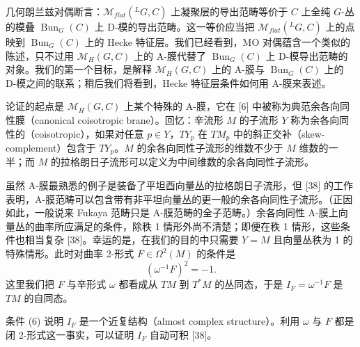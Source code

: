 \documentclass[11pt,a4paper,UTF8]{ctexart}
\begin{document}
几何朗兰兹对偶断言：$\mathcal{M}_{flat}({}^{L}G,C)$ 上凝聚层的导出范畴等价于 $C$ 上全纯 $G$-丛的模叠 $\operatorname{Bun}_{G}(C)$ 上 D-模的导出范畴。这一等价应当把 $\mathcal{M}_{flat}({}^{L}G,C)$ 上的点映到 $\operatorname{Bun}_{G}(C)$ 上的 Hecke 特征层。我们已经看到，MO 对偶蕴含一个类似的陈述，只不过用 $\mathcal{M}_{H}(G,C)$ 上的 A-膜代替了 $\operatorname{Bun}_{G}(C)$ 上 D-模导出范畴的对象。我们的第一个目标，是解释 $\mathcal{M}_{H}(G,C)$ 上的 A-膜与 $\operatorname{Bun}_{G}(C)$ 上的 D-模之间的联系；稍后我们将看到，Hecke 特征层条件如何用 A-膜来表述。

论证的起点是 $\mathcal{M}_{H}(G,C)$ 上某个特殊的 A-膜，它在 [6] 中被称为典范余各向同性膜（canonical coisotropic brane）。回忆：辛流形 $M$ 的子流形 $Y$ 称为余各向同性的（coisotropic），如果对任意 $p\in Y$，$TY_{p}$ 在 $TM_{p}$ 中的斜正交补（skew-complement）包含于 $TY_{p}$。$M$ 的余各向同性子流形的维数不少于 $M$ 维数的一半；而 $M$ 的拉格朗日子流形可以定义为中间维数的余各向同性子流形。


虽然 A-膜最熟悉的例子是装备了平坦酉向量丛的拉格朗日子流形，但 [38] 的工作表明，A-膜范畴可以包含带有非平坦向量丛的更一般的余各向同性子流形。（正因如此，一般说来 Fukaya 范畴只是 A-膜范畴的全子范畴。）余各向同性 A-膜上向量丛的曲率所应满足的条件，除秩 1 情形外尚不清楚；即便在秩 1 情形，这些条件也相当复杂 [38]。幸运的是，在我们的目的中只需要 $Y=M$ 且向量丛秩为 1 的特殊情形。此时对曲率 2-形式 $F\in\Omega^{2}(M)$ 的条件是
\begin{equation}
    (\omega^{-1}F)^{2}=-1. \tag{6}
\end{equation}
这里我们把 $F$ 与辛形式 $\omega$ 都看成从 $TM$ 到 $T^{*}M$ 的丛同态，于是 $I_{F}=\omega^{-1}F$ 是 $TM$ 的自同态。


条件 (6) 说明 $I_{F}$ 是一个近复结构（almost complex structure）。利用 $\omega$ 与 $F$ 都是闭 2-形式这一事实，可以证明 $I_{F}$ 自动可积 [38]。

\end{document}
